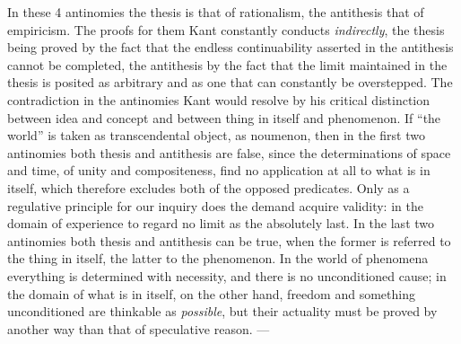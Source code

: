 In these 4 antinomies the thesis is that of rationalism, the antithesis
that of empiricism. The proofs for them Kant constantly conducts
\emph{indirectly}, the thesis being proved by the fact that the endless
continuability asserted in the antithesis cannot be completed,
the antithesis by the fact that the limit maintained in the thesis is
posited as arbitrary and as one that can constantly be overstepped. The
contradiction in the antinomies Kant would resolve by his critical
distinction between idea and concept and between thing in itself and
phenomenon. If ``the world'' is taken as transcendental object, as
noumenon, then in the first two antinomies both thesis and antithesis are
false, since the determinations of space and time, of unity and
compositeness, find no application at all to what is in itself, which
therefore excludes both of the opposed predicates. Only as a regulative
principle for our inquiry does the demand acquire validity: in the domain
of experience to regard no limit as the absolutely last. In the last two
antinomies both thesis and antithesis can be true, when the former is
referred to the thing in itself, the latter to the phenomenon. In the
world of phenomena everything is determined
with necessity, and there is no unconditioned cause; in the domain of
what is in itself, on the other hand, freedom and something unconditioned
are thinkable as \emph{possible}, but their actuality must be proved by
another way than that of speculative reason. ---

